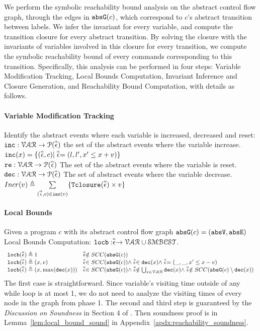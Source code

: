 We perform the symbolic reachability bound analysis on the abstract control flow graph, 
through the edges in $\mathtt{abs}{\mathtt{G}}(c)$, which correspond to $c$'s abstract transition between labels.
We infer the invariant for every variable, and compute the transition closure for every abstract transition. By solving the closure
with the invariants of variables involved in this closure for every transition, we compute
the symbolic reachability bound of every commands corresponding to this transition. Specifically, this analysis can be performed in four steps:
 Variable Modification Tracking, Local Bounds Computation,
Invariant Inference and Closure Generation, and Reachability Bound Computation,
% 
with details as follows.
%
%
\paragraph*{Variable Modification Tracking}
Identify the abstract events where each variable is increased, decreased and reset:
\\
$\mathtt{inc}: \mathcal{VAR} \to \mathcal{P}(\stackrel{\scriptscriptstyle{\alpha}}{\mathtt{\epsilon}{}}) $
the set of the abstract events where the variable increase.
\\
$\mathtt{inc}(x) = \{(\stackrel{\scriptscriptstyle{\alpha}}{\mathtt{\epsilon}{}}, c) | \stackrel{\scriptscriptstyle{\alpha}}{\mathtt{\epsilon}{}} = (l, l', x' \leq x + v)\}$
\\
$\mathtt{re}: \mathcal{VAR} \to \mathcal{P}(\stackrel{\scriptscriptstyle{\alpha}}{\mathtt{\epsilon}{}}) $
The set of the abstract events where the variable is reset.
\\
$\mathtt{dec}: \mathcal{VAR} \to \mathcal{P}(\stackrel{\scriptscriptstyle{\alpha}}{\mathtt{\epsilon}{}}) $
The set of abstract events where the variable decrease.
\\
$Incr(v) \triangleq \sum\limits_{(\stackrel{\scriptscriptstyle{\alpha}}{\mathtt{\epsilon}{}}, c) \in \mathtt{inc}(v)}\{{\mathtt{Tclosure}}(\stackrel{\scriptscriptstyle{\alpha}}{\mathtt{\epsilon}{}}) \times v\}$
%
\paragraph*{Local Bounds}
Given a program $c$ with its abstract control flow graph 
$\mathtt{abs}{\mathtt{G}}(c) = (\mathtt{abs}{\mathtt{V}}, \mathtt{abs}{\mathtt{E}})$
\\
Local Bounds Computation:
$\mathtt{locb}: \stackrel{\scriptscriptstyle{\alpha}}{\mathtt{\epsilon}{}} \to \mathcal{VAR} \cup \mathcal{SMBCST}$.
%
\[ 
\begin{array}{ll}
  \mathtt{locb}(\stackrel{\scriptscriptstyle{\alpha}}{\mathtt{\epsilon}{}}) \triangleq 1 
  & \stackrel{\scriptscriptstyle{\alpha}}{\mathtt{\epsilon}{}} \notin SCC(\mathtt{abs}{\mathtt{G}}(c))
  \\
  \mathtt{locb}(\stackrel{\scriptscriptstyle{\alpha}}{\mathtt{\epsilon}{}}) \triangleq (x, v) 
  & \stackrel{\scriptscriptstyle{\alpha}}{\mathtt{\epsilon}{}} \in SCC(\mathtt{abs}{\mathtt{G}}(c)) \land \stackrel{\scriptscriptstyle{\alpha}}{\mathtt{\epsilon}{}} \in \mathtt{dec}(x) \land  \stackrel{\scriptscriptstyle{\alpha}}{\mathtt{\epsilon}{}} = (\_, \_ , x' \leq x - v) \\
  \mathtt{locb}(\stackrel{\scriptscriptstyle{\alpha}}{\mathtt{\epsilon}{}}) \triangleq (x, \max(\mathtt{dec}(x))) 
  & \stackrel{\scriptscriptstyle{\alpha}}{\mathtt{\epsilon}{}} \in SCC(\mathtt{abs}{\mathtt{G}}(c)) \land 
  \stackrel{\scriptscriptstyle{\alpha}}{\mathtt{\epsilon}{}}  \notin \bigcup_{x \in \mathcal{VAR}} \mathtt{dec}(x)
  \land \stackrel{\scriptscriptstyle{\alpha}}{\mathtt{\epsilon}{}} \notin SCC(\mathtt{abs}{\mathtt{G}}(c) \setminus \mathtt{dec}(x)) 
\end{array}
  \]
  The first case is straightforward. Since variable's visiting time outside of any while loop is at most 1, we do not need to analyze the visiting times of every node in the graph from phase 1.
  The second and third step is guaranteed by the \emph{Discussion on Soundness} in Section 4 of \cite{sinn2017complexity}.
  Then soundness proof is in Lemma~\ref{lem:local_bound_sound} in Appendix~\ref{apdx:reachability_soundness}.
%
